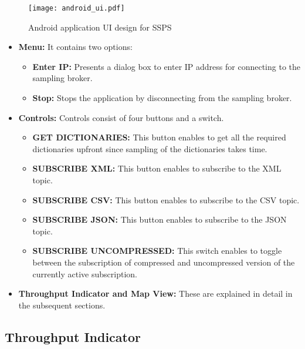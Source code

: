 \begin{figure}[h!]
\centering
\texttt{[image: android\_ui.pdf]}
\caption{Android application UI design for SSPS}\label{figures:android_ui}
\end{figure}

\begin{itemize}
    \item \textbf{Menu:}
          It contains two options: 
            \begin{itemize}
                \item \textbf{Enter IP:}
                Presents a dialog box to enter IP address for connecting to the sampling broker.
                \item \textbf{Stop:}
                Stops the application by disconnecting from the sampling broker.
            \end{itemize}

    \item \textbf{Controls:}
    Controls consist of four buttons and a switch.
    \begin{itemize}
        \item \textbf{GET DICTIONARIES:}
        This button enables to get all the required dictionaries upfront since sampling of the dictionaries takes time.
        \item \textbf{SUBSCRIBE XML:}
        This button enables to subscribe to the XML topic.
        \item \textbf{SUBSCRIBE CSV:}
        This button enables to subscribe to the CSV topic.
        \item \textbf{SUBSCRIBE JSON:}
        This button enables to subscribe to the JSON topic.
        \item \textbf{SUBSCRIBE UNCOMPRESSED:}
        This switch enables to toggle between the subscription of compressed and uncompressed version of the currently active subscription.
    \end{itemize}

    \item \textbf{Throughput Indicator and Map View:}
    These are explained in detail in the subsequent sections.
\end{itemize}

\subsection{Throughput Indicator}

